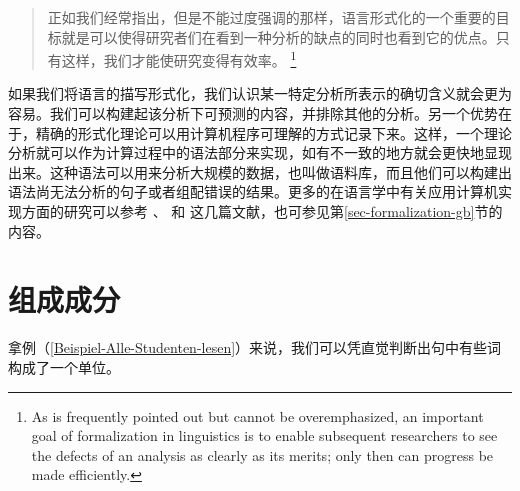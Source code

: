\begin{quotation}
正如我们经常指出，但是不能过度强调的那样，语言形式化的一个重要的目标就是可以使得研究者们在看到一种分析的缺点的同时也看到它的优点。只有这样，我们才能使研究变得有效率。
\citep[]{Dowty79a}\footnote{%
As is frequently pointed out but cannot be overemphasized, an important goal
of formalization in linguistics is to enable subsequent researchers to see the defects
of an analysis as clearly as its merits; only then can progress be made efficiently.}
\end{quotation}
%
如果我们将语言的描写形式化，我们认识某一特定分析所表示的确切含义就会更为容易。我们可以构建起该分析下可预测的内容，并排除其他的分析。另一个优势在于，精确的形式化理论可以用计算机程序可理解的方式记录下来。这样，一个理论分析就可以作为计算过程中的语法部分来实现，如有不一致的地方就会更快地显现出来。这种语法可以用来分析大规模的数据，也叫做语料库，而且他们可以构建出语法尚无法分析的句子或者组配错误的结果。更多的在语言学中有关应用计算机实现方面的研究可以参考 、 和  这几篇文献，也可参见第\ref{sec-formalization-gb}节的内容。

\section{组成成分}
\label{konstituententests}\label{sec-constituents}

拿例（\ref{Beispiel-Alle-Studenten-lesen}）来说，我们可以凭直觉判断出句中有些词构成了一个单位。

